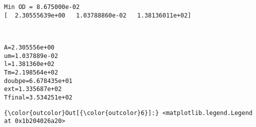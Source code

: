 \documentclass[11pt]{article}
\begin{document}
    \begin{Verbatim}[commandchars=\\\{\}]
Min OD = 8.675000e-02
[  2.30555639e+00   1.03788860e-02   1.38136011e+02]

    \end{Verbatim}

    \begin{center}
    \end{center}
    { \hspace*{\fill} \\}
    
    \begin{Verbatim}[commandchars=\\\{\}]
A=2.305556e+00
um=1.037889e-02
l=1.381360e+02
Tm=2.198564e+02
doubpe=6.678435e+01
ext=1.335687e+02
Tfinal=3.534251e+02

    \end{Verbatim}

            \begin{Verbatim}[commandchars=\\\{\}]
{\color{outcolor}Out[{\color{outcolor}6}]:} <matplotlib.legend.Legend at 0x1b204026a20>
\end{Verbatim}
        
    \begin{center}
    \end{center}
    { \hspace*{\fill} \\}
    
    \begin{center}
    \end{center}
    { \hspace*{\fill} \\}
    
\end{document}
